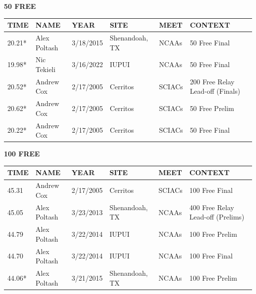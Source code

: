 \begin{table}[H]
\centering
\begin{minipage}[t]{0.48\textwidth}
\centering
\textbf{50 FREE}\\[0.1cm]
\begin{tabular}{@{}p{1.8cm}p{2.8cm}p{1.2cm}p{1.4cm}p{1.4cm}p{2.0cm}@{}}
\hline
    \textbf{TIME} & \textbf{NAME} & \textbf{YEAR} & \textbf{SITE} & \textbf{MEET} & \textbf{CONTEXT} \\
\hline
    20.21* & Alex Poltash & 3/18/2015 & Shenandoah, TX & NCAAs & 50 Free Final \\
    19.98* & Nic Tekieli & 3/16/2022 & IUPUI & NCAAs & 50 Free Final \\
    20.52* & Andrew Cox & 2/17/2005 & Cerritos & SCIACs & 200 Free Relay Lead-off (Finals) \\
    20.62* & Andrew Cox & 2/17/2005 & Cerritos & SCIACs & 50 Free Prelim \\
    20.22* & Andrew Cox & 2/17/2005 & Cerritos & SCIACs & 50 Free Final \\
\hline
\end{tabular}
\end{minipage}\hfill
\begin{minipage}[t]{0.48\textwidth}
\centering
\textbf{100 FREE}\\[0.1cm]
\begin{tabular}{@{}p{1.8cm}p{2.8cm}p{1.2cm}p{1.4cm}p{1.4cm}p{2.0cm}@{}}
\hline
    \textbf{TIME} & \textbf{NAME} & \textbf{YEAR} & \textbf{SITE} & \textbf{MEET} & \textbf{CONTEXT} \\
\hline
    45.31 & Andrew Cox & 2/17/2005 & Cerritos & SCIACs & 100 Free Final \\
    45.05 & Alex Poltash & 3/23/2013 & Shenandoah, TX & NCAAs & 400 Free Relay Lead-off (Prelims) \\
    44.79 & Alex Poltash & 3/22/2014 & IUPUI & NCAAs & 100 Free Prelim \\
    44.70 & Alex Poltash & 3/22/2014 & IUPUI & NCAAs & 100 Free Final \\
    44.06* & Alex Poltash & 3/21/2015 & Shenandoah, TX & NCAAs & 100 Free Prelim \\
\hline
\end{tabular}
\end{minipage}
\end{table}


